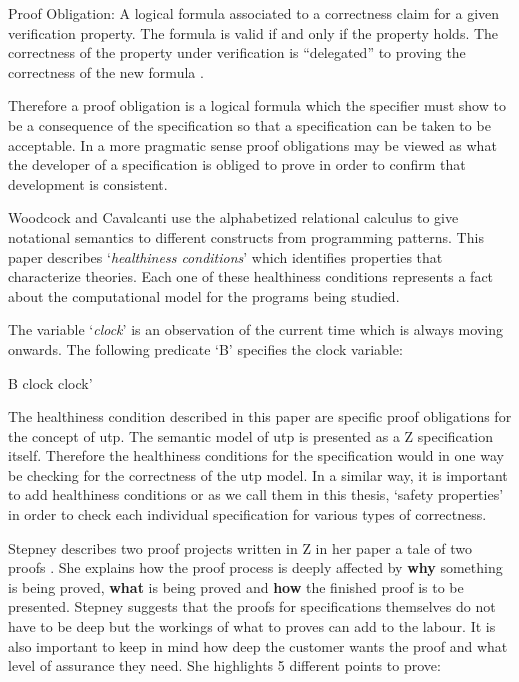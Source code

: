 \begin{defin}
Proof Obligation: A logical formula associated to a correctness claim for a given verification
property. The formula is valid if and only if the property holds. The
correctness of the property under verification is “delegated” to proving the
correctness of the new formula \cite{handbookofembed}.
\end{defin}

Therefore a proof obligation is a logical formula which the specifier must show
to be a consequence of the specification so that a specification can be taken to
be acceptable. In a more pragmatic sense proof obligations may be viewed as what
the developer of a specification is obliged to prove in order to confirm that
development is consistent.

Woodcock and Cavalcanti \cite{woodcock2004tutorial} use the alphabetized
relational calculus to give notational semantics to different constructs from
programming patterns. This paper describes `\emph{healthiness conditions}' which
identifies properties that characterize theories. Each one of these healthiness
conditions represents a fact about the computational model for the programs
being studied.

\begin{exam}
The variable `\emph{clock}' is an observation of the current time which is
always moving onwards. The following predicate `B' specifies the clock variable:

\begin{zed}
B  clock \leq clock'
\end{zed}
\end{exam}

The healthiness condition described in this paper are specific proof obligations
for the concept of \Gls{utp}. The semantic model of \gls{utp} is presented as a Z
specification itself. Therefore the healthiness conditions for the specification would
in one way be checking for the correctness of the \gls{utp} model. In a similar
way, it is important to add healthiness conditions or as we call them in this
thesis, `safety properties' in order to check each individual specification for
various types of correctness.

Stepney describes two proof projects written in Z in her paper a tale of two
proofs \cite{stepney1998tale}. She explains how the proof process is deeply
affected by \textbf{why} something is being proved, \textbf{what} is being
proved and \textbf{how} the finished proof is to be presented. Stepney suggests
that the proofs for specifications themselves do not have to be deep but the
workings of what to proves can add to the labour. It is also important to keep
in mind how deep the customer wants the proof and what level of assurance they
need. She highlights 5 different points to prove:

